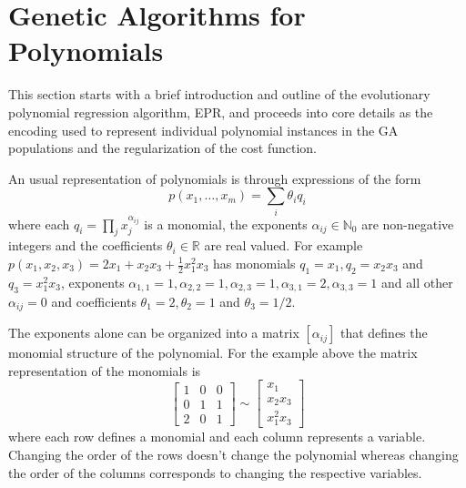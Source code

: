 \documentclass[times,review,preprint]{elsarticle}
\begin{document}
\section{Genetic Algorithms for Polynomials}
This section starts with a brief introduction and outline of the evolutionary polynomial regression algorithm, \ac{EPR}, and proceeds into core details as the encoding used to represent individual polynomial instances in the \ac{GA} populations and the regularization of the cost function.

An usual representation of polynomials is through expressions of the form
$$
p\left( x_1, \ldots, x_m\right) = \sum_i \theta_i q_i
$$
where each $q_i = \prod_{j} x_j^{\alpha_{ij}}$ is a monomial, the exponents $\alpha_{ij}\in\mathbb{N}_0$ are non-negative integers and the coefficients $\theta_i \in \mathbb{R}$ are real valued. For example $p\left( x_1, x_2, x_3 \right) = 2 x_1 + x_2 x_3 + \frac{1}{2} x_1^2 x_3$ has monomials $q_1 = x_1, q_2 = x_2 x_3$ and $q_3 = x_1^2 x_3$, exponents $\alpha_{1,1} = 1, \alpha_{2,2}=1, \alpha_{2,3} = 1, \alpha_{3,1} = 2, \alpha_{3,3} = 1$ and all other $\alpha_{ij} = 0$ and coefficients $\theta_1 = 2, \theta_2 = 1$ and $\theta_3 = 1/2$.

The exponents alone can be organized into a matrix $\left[\alpha_{ij}\right]$ that defines the monomial structure of the polynomial. For the example above the matrix representation of the monomials is
$$
\left[ 
\begin{array}{ccc}
1 & 0 & 0 \\
0 & 1 & 1 \\
2 & 0 & 1
\end{array}
\right] \sim 
\left[ 
\begin{array}{ccc}
x_1 \\
x_2 x_3 \\
x_1^2 x_3
\end{array}
\right]
$$
where each row defines a monomial and each column represents a variable. Changing the order of the rows doesn't change the polynomial whereas changing the order of the columns corresponds to changing the respective variables.
\end{document}
